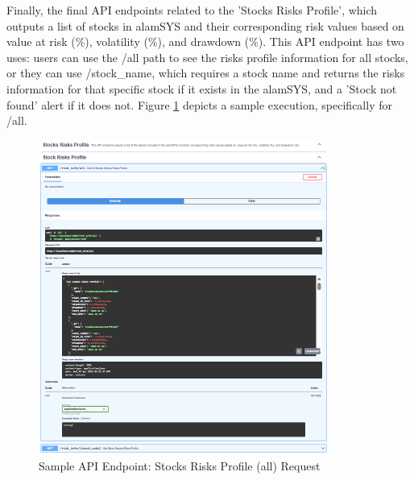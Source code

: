 Finally, the final API endpoints related to the 'Stocks Risks Profile', 
which outputs a list of stocks in alamSYS and their corresponding risk 
values based on value at risk (\%), volatility (\%), and drawdown (\%). 
This API endpoint has two uses: users can use the /all path to see the risks 
profile information for all stocks, or they can use /stock\_name, which 
requires a stock name and returns the risks information for that specific 
stock if it exists in the alamSYS, and a 'Stock not found' alert if it 
does not. Figure \ref{fig:alamAPI_risk} depicts a sample execution, 
specifically for /all.
\begin{figure}[ht]
    \centering
    \includegraphics[width=0.85\textwidth]{./assets/Chapter_4/Documentation/alamAPI_risk.png}
    \caption{Sample API Endpoint: Stocks Risks Profile (all) Request}
    \label{fig:alamAPI_risk}
\end{figure}
\FloatBarrier

